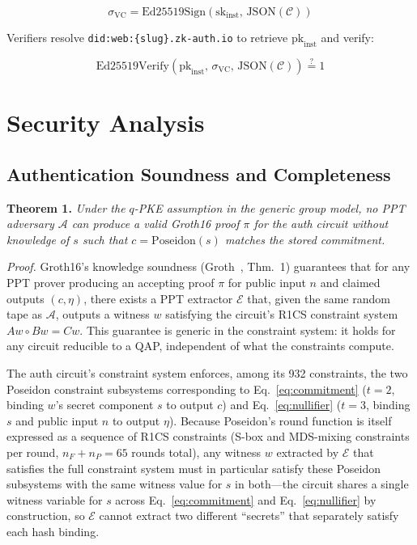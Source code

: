 \documentclass[journal,twoside,10pt]{IEEEtran}
\begin{document}
\begin{equation}
  \sigma_{\text{VC}} = \mathrm{Ed25519Sign}(\mathrm{sk}_{\text{inst}},\,
                       \mathrm{JSON}(\mathcal{C}))
  \label{eq:vcsign}
\end{equation}

Verifiers resolve \texttt{did:web:\{slug\}.zk-auth.io} to retrieve
$\mathrm{pk}_{\text{inst}}$ and verify:

\begin{equation}
  \mathrm{Ed25519Verify}(\mathrm{pk}_{\text{inst}},\,
  \sigma_{\text{VC}},\, \mathrm{JSON}(\mathcal{C})) \stackrel{?}{=} 1
  \label{eq:vcverify}
\end{equation}

\section{Security Analysis}
\label{sec:security}

\subsection{Authentication Soundness and Completeness}
\textbf{Theorem 1.} \textit{Under the $q$-PKE assumption in the generic group
model, no PPT adversary $\mathcal{A}$ can produce a valid Groth16 proof
$\pi$ for the auth circuit without knowledge of $s$ such that
$c = \mathrm{Poseidon}(s)$ matches the stored commitment.}

\textit{Proof.} Groth16's knowledge soundness (Groth~\cite{groth16}, Thm.~1) guarantees that for any PPT prover producing an accepting proof $\pi$ for public input $n$ and claimed outputs $(c, \eta)$, there exists a PPT extractor $\mathcal{E}$ that, given the same random tape as $\mathcal{A}$, outputs a witness $w$ satisfying the circuit's R1CS constraint system $Aw \circ Bw = Cw$. This guarantee is generic in the constraint system: it holds for any circuit reducible to a QAP, independent of what the constraints compute.

The auth circuit's constraint system enforces, among its 932 constraints, the two Poseidon constraint subsystems corresponding to Eq.~\ref{eq:commitment} ($t{=}2$, binding $w$'s secret component $s$ to output $c$) and Eq.~\ref{eq:nullifier} ($t{=}3$, binding $s$ and public input $n$ to output $\eta$). Because Poseidon's round function is itself expressed as a sequence of R1CS constraints (S-box and MDS-mixing constraints per round, $n_F{+}n_P{=}65$ rounds total), any witness $w$ extracted by $\mathcal{E}$ that satisfies the full constraint system must in particular satisfy these Poseidon subsystems with the same witness value for $s$ in both---the circuit shares a single witness variable for $s$ across Eq.~\ref{eq:commitment} and Eq.~\ref{eq:nullifier} by construction, so $\mathcal{E}$ cannot extract two different ``secrets'' that separately satisfy each hash binding.
\end{document}
